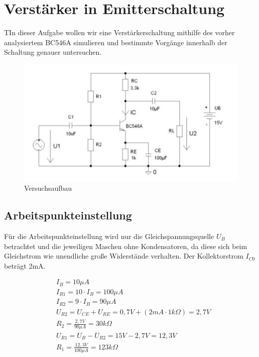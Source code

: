 \documentclass{article}
\begin{document}
\section{Verstärker in Emitterschaltung}

\begin{task}
  TIn dieser Aufgabe wollen wir eine Verstärkerschaltung mithilfe des vorher analysiertem BC546A simulieren und bestimmte Vorgänge innerhalb der Schaltung genauer untersuchen.
\end{task}

\begin{figure}[h]
  \centering
  \includegraphics{../assets/images/EL1P3/aufbau aufgabe2.jpg}
  \caption{Versuchsaufbau}
  \label{fig:schalt2}
\end{figure}


\subsection{Arbeitspunkteinstellung}
Für die Arbeitspunkteinstellung wird nur die Gleichspannungsquelle $U_B$ betrachtet und die jeweiligen Maschen ohne Kondensatoren, da diese sich beim Gleichstrom wie unendliche große Widerstände verhalten.
Der Kollektorstrom $I_{C0}$ beträgt 2mA.

\begin{align*}
  &I_B = 10\mu A\\
  &I_{R1}=10\cdot I_B = 100\mu A\\
  &I_{R2}= 9\cdot I_B = 90\mu A\\
  &U_{R2} = U_{CE} + U_{RE} = 0,7V + (2mA\cdot 1k\Omega) = 2,7V\\
  &R_{2} = \frac{2,7V}{90\mu A} = 30k\Omega\\
  &U_{R1} = U_B - U_{R2} = 15V - 2,7V = 12,3V\\
  &R_{1} = \frac{12,3V}{100\mu A}=123k\Omega
\end{align*}
\end{document}
